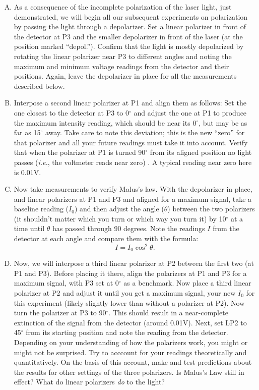 \begin{enumerate}[(A)]
\item As a consequence of the incomplete polarization of the laser light, just demonstrated, we will begin all our subsequent experiments on polarization by passing the light through a depolarizer. Set a linear polarizer in front of the detector at P3 and the smaller depolarizer in front of the laser (at the position marked ``depol.''). Confirm that the light is mostly depolarized by rotating the linear polarizer near P3 to different angles and noting the maximum and minimum voltage readings from the detector and their positions. Again, leave the depolarizer in place for all the measurements described below.


\item Interpose a second linear polarizer at P1 and align them as follows: Set the one closest to the detector at P3 to 0$^{\circ}$ and adjust the one at P1 to produce the maximum intensity reading, which should be near its 0$^{\circ}$, but may be as far as 15$^\circ$ away. Take care to note this deviation; this is the new ``zero'' for that polarizer and all your future readings must take it into account. Verify that when the polarizer at P1 is turned 90$^{\circ}$ from its aligned position no light passes (\emph{i.e.}, the voltmeter reads near zero) . A typical reading near zero here is 0.01V.

\item Now take measurements to verify Malus's law.  With the depolarizer in place, and linear polarizers at P1 and P3 and aligned for a maximum signal, take a baseline reading ($I_0$) and then adjust the angle ($\theta$) between the two polarizers (it shouldn't matter which you turn or which way you 
turn it) by 10$^{\circ}$ at a time until $\theta$ has passed through 90 degrees. Note the readings $I$ from the detector at each angle and compare them with the formula:
\begin{equation*}
I = I_0 \cos^{2} \theta.
\end{equation*}

\item Now, we will interpose a third linear polarizer at P2 between the first two (at P1 and P3). Before placing it there, align the polarizers at P1 and P3 for a maximum signal, with P3 set at 0$^\circ$ as a benchmark. Now place a third linear polarizer at P2 and adjust it until you get a maximum signal, your new $I_0$ for this experiment (likely slightly lower than without a polarizer at P2). Now turn the polarizer at P3 to 90$^{\circ}$. This 
should result in a near-complete extinction of the signal from the detector (around 0.01V). Next, set LP2 to 45$^{\circ}$ from its starting position and note the reading from the detector. Depending on your understanding of how the polarizers work, you might or might not be surprised. Try to acccount for your readings theoretically and quantitatively. On the basis of this account, make and test predictions about the results for other settings of the three polarizers. Is Malus's Law still in effect? What do linear polarizers \emph{do} to the light?


\end{enumerate}
